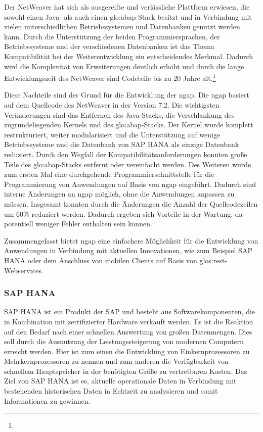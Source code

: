 \begin{onehalfspacing}
Der \gls{NetWeaver} hat sich als ausgereifte und verlässliche Plattform erwiesen, die sowohl einen Java- als auch einen \gls{glo:abap}-Stack besitzt und in Verbindung mit vielen unterschiedlichen Betriebssystemen und Datenbanken genutzt werden kann. Durch die Unterstützung der beiden Programmiersprachen, der Betriebssysteme und der verschiedenen Datenbanken ist das Thema Kompatibilität bei der Weiterentwicklung ein entscheidendes Merkmal. Dadurch wird die Komplexität von Erweiterungen deutlich erhöht und durch die lange Entwicklungszeit des \gls{NetWeaver} sind Codeteile bis zu 20 Jahre alt.\footnote{ }

Diese Nachteile sind der Grund für die Entwicklung der \gls{ngap}. Die \gls{ngap} basiert auf dem Quellcode des \gls{NetWeaver} in der Version 7.2. Die wichtigsten Veränderungen sind das Entfernen des Java-Stacks, die Verschlankung des zugrundeliegenden Kernels und des \gls{glo:abap}-Stacks. Der Kernel wurde komplett restrukturiert, weiter modularisiert und die Unterstützung auf wenige Betriebssysteme und die Datenbank von SAP HANA als einzige Datenbank reduziert. Durch den Wegfall der Kompatibilitätsanforderungen konnten große Teile des \gls{glo:abap}-Stacks entfernt oder vereinfacht werden. Des Weiteren wurde zum ersten Mal eine durchgehende Programmierschnittstelle für die Programmierung von Anwendungen auf Basis von \gls{ngap} eingeführt. Dadurch sind interne Änderungen an \gls{ngap} möglich, ohne die Anwendungen anpassen zu müssen. Insgesamt konnten durch die Änderungen die Anzahl der Quellcodezeilen um 60\% reduziert werden. Dadurch ergeben sich Vorteile in der Wartung, da potentiell weniger Fehler enthalten sein können.

Zusammengefasst bietet \gls{ngap} eine einfachere Möglichkeit für die Entwicklung von Anwendungen in Verbindung mit aktuellen Innovationen, wie zum Beispiel SAP HANA oder dem Anschluss von mobilen Clients auf Basis von \gls{glos:rest}-Webservices.

\subsubsection{SAP HANA}
SAP HANA ist ein Produkt der SAP und besteht aus Softwarekomponenten, die in Kombination mit zertifizierter Hardware verkauft werden. Es ist die Reaktion auf den Bedarf nach einer schnellen Auswertung von großen Datenmengen. Dies soll durch die Ausnutzung der Leistungssteigerung von modernen Computern erreicht werden. Hier ist zum einen die Entwicklung von Einkernprozessoren zu Mehrkernprozessoren zu nennen und zum anderen die Verfügbarkeit von schnellem Hauptspeicher in der benötigten Größe zu vertretbaren Kosten. Das Ziel von SAP HANA ist es, aktuelle operationale Daten in Verbindung mit bestehenden historischen Daten in Echtzeit zu analysieren und somit Informationen zu gewinnen.


\end{onehalfspacing}
